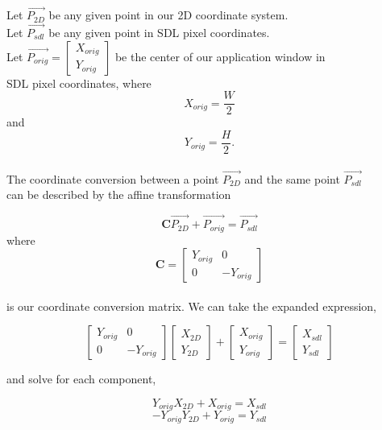 \documentclass[11pt]{article}
\begin{document}
Let $\vec{P_{2D}}$ be any given point in our 2D coordinate system.\\
Let $\vec{P_{sdl}}$ be any given point in SDL pixel coordinates.\\
Let $\vec{P_{orig}}=\begin{bmatrix} X_{orig}\\  Y_{orig} \end{bmatrix}$ be the center of our application window in\\ 
SDL pixel coordinates, where\\

$$X_{orig} = \frac{W}{2}$$
and
$$Y_{orig} = \frac{H}{2}.$$
\\

The coordinate conversion between a point $\vec{P_{2D}}$ and the same point $\vec{P_{sdl}}$\\
can be described by the affine transformation

$$ \mathbf{C}\vec{P_{2D}} + \vec{P_{orig}} = \vec{P_{sdl}}$$
where
$$ \mathbf{C}= \begin{bmatrix} Y_{orig} &    0 \\
                                   0     & -Y_{orig} \end{bmatrix}$$
\\
is our coordinate conversion matrix. We can take the expanded expression,

$$ \begin{bmatrix} Y_{orig} & 0\\ 0 & -Y_{orig} \end{bmatrix} \begin{bmatrix}X_{2D}\\ Y_{2D}\end{bmatrix} +
\begin{bmatrix} X_{orig}\\ Y_{orig}\end{bmatrix} = \begin{bmatrix} X_{sdl}\\ Y_{sdl}\end{bmatrix}$$

and solve for each component,

$$ Y_{orig} X_{2D} + X_{orig} = X_{sdl}$$
$$-Y_{orig} Y_{2D} + Y_{orig} = Y_{sdl}$$
\end{document}

